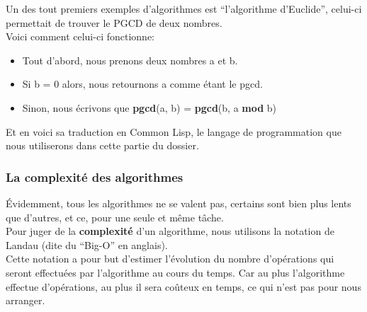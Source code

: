 \documentclass[a4paper, 12pt]{article}
\numberwithin{equation}{subsection}
\begin{document}
Un des tout premiers exemples d'algorithmes est ``l'algorithme d'Euclide'', celui-ci permettait de trouver le PGCD de deux nombres.\\
Voici comment celui-ci fonctionne: \\[0.2cm]
\begin{itemize}
  \item Tout d'abord, nous prenons deux nombres a et b.
  \item Si b = 0 alors, nous retournons a comme étant le pgcd.
  \item Sinon, nous écrivons que {\bf pgcd}(a, b) = {\bf pgcd}(b, a {\bf mod} b)\\[0.2cm]
\end{itemize}
Et en voici sa traduction en Common Lisp, le langage de programmation que nous utiliserons dans cette partie du dossier.


\subsubsection{La complexité des algorithmes}
Évidemment, tous les algorithmes ne se valent pas, certains sont bien plus lents que d'autres, et ce, pour une seule et même tâche.\\
Pour juger de la {\bf complexité} d'un algorithme, nous utilisons la notation de Landau (dite du ``Big-O'' en anglais). \\

Cette notation a pour but d'estimer l'évolution du nombre d'opérations qui seront effectuées par l'algorithme au cours du temps. Car au plus l'algorithme effectue d'opérations, au plus il sera coûteux en temps, ce qui n'est pas pour nous arranger. \\
\end{document}
